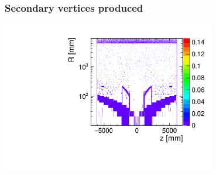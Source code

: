 \documentclass[aspectratio=169, hyperref={colorlinks=true,pdfpagelabels=false,linkcolor=black}, xcolor=dvipsnames,10pt]{beamer}
\begin{document}
\begin{frame}
	\frametitle{Secondary vertices produced}


	\centering
	\includegraphics[width=0.7\textwidth]{../figures/SecondaryVertices_logScale.pdf}

	
\end{frame}



\end{document}
